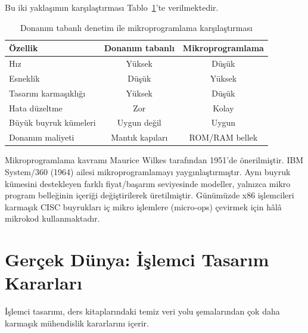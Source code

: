 Bu iki yaklaşımın karşılaştırması Tablo~\ref{tab:donanim-mikro-karsilastirma}'te verilmektedir.

\begin{table}[htbp]
\centering
\caption{Donanım tabanlı denetim ile mikroprogramlama karşılaştırması}
\label{tab:donanim-mikro-karsilastirma}
\begin{tabular}{lcc}
\toprule
\textbf{Özellik} & \textbf{Donanım tabanlı} & \textbf{Mikroprogramlama} \\
\midrule
Hız & Yüksek & Düşük \\
Esneklik & Düşük & Yüksek \\
Tasarım karmaşıklığı & Yüksek & Düşük \\
Hata düzeltme & Zor & Kolay \\
Büyük buyruk kümeleri & Uygun değil & Uygun \\
Donanım maliyeti & Mantık kapıları & ROM/RAM bellek \\
\bottomrule
\end{tabular}
\end{table}

\begin{bilginot}
Mikroprogramlama kavramı Maurice Wilkes tarafından 1951'de önerilmiştir. IBM System/360 (1964) ailesi mikroprogramlamayı yaygınlaştırmıştır. Aynı buyruk kümesini destekleyen farklı fiyat/başarım seviyesinde modeller, yalnızca mikro program belleğinin içeriği değiştirilerek üretilmiştir. Günümüzde x86 işlemcileri karmaşık CISC buyrukları iç mikro işlemlere (micro-ops) çevirmek için hâlâ mikrokod kullanmaktadır.
\end{bilginot}


\section{Gerçek Dünya: İşlemci Tasarım Kararları}
\label{sec:islemci-gercek-dunya}

İşlemci tasarımı, ders kitaplarındaki temiz veri yolu şemalarından çok daha karmaşık mühendislik kararlarını içerir.

